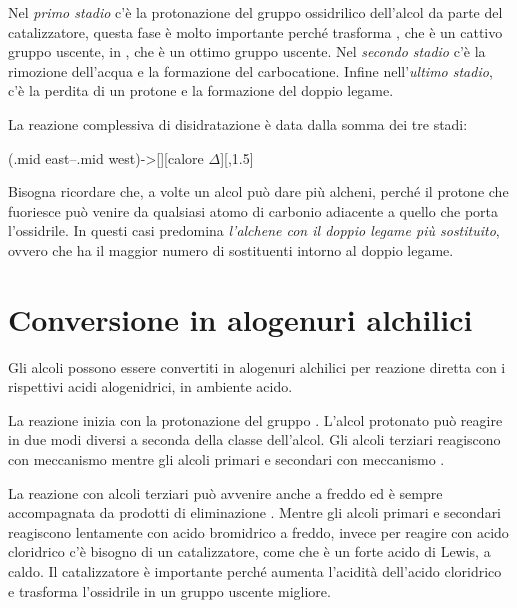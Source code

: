 Nel \textit{primo stadio} c'è la protonazione del gruppo ossidrilico dell'alcol da parte del catalizzatore, questa fase è molto importante perché trasforma , che è un cattivo gruppo uscente, in , che è un ottimo gruppo uscente. Nel \textit{secondo stadio} c'è la rimozione dell'acqua e la formazione del carbocatione. Infine nell'\textit{ultimo stadio}, c'è la perdita di un protone e la formazione del doppio legame.

La reazione complessiva di disidratazione è data dalla somma dei tre stadi:
\begin{reaction*}
	\arrow(.mid east--.mid west){->[][calore \(\Delta\)]}[,1.5]
	 \+ 
\end{reaction*}

Bisogna ricordare che, a volte un alcol può dare più alcheni, perché il protone che fuoriesce può venire da qualsiasi atomo di carbonio adiacente a quello che porta l'ossidrile. In questi casi predomina \textit{l'alchene con il doppio legame più sostituito}, ovvero che ha il maggior numero di sostituenti intorno al doppio legame.


\section{Conversione in alogenuri alchilici}\label{rxn:alcol-convHX}
Gli alcoli possono essere convertiti in alogenuri alchilici per reazione diretta con i rispettivi acidi alogenidrici, in ambiente acido.

La reazione inizia con la protonazione del gruppo . L'alcol protonato può reagire in due modi diversi a seconda della classe dell'alcol. Gli alcoli terziari reagiscono con meccanismo \mech[1] mentre gli alcoli primari e secondari con meccanismo \mech[2].

La reazione con alcoli terziari può avvenire anche a freddo ed è sempre accompagnata da prodotti di eliminazione \mech[e1]. Mentre gli alcoli primari e secondari reagiscono lentamente con acido bromidrico  a freddo, invece per reagire con acido cloridrico  c'è bisogno di un catalizzatore, come  che è un forte acido di Lewis, a caldo. Il catalizzatore è importante perché aumenta l'acidità dell'acido cloridrico e trasforma l'ossidrile in un gruppo uscente migliore.

